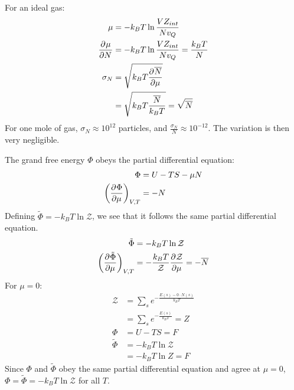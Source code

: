 \documentclass{article}
\begin{document}
For an ideal gas:
\begin{equation}
    \begin{split}
        \mu & = -k_BT\ln\frac{VZ_{int}}{Nv_Q} \\
        \frac{\partial^{} \mu} {\partial  N^{}} & = -k_BT\ln\frac{VZ_{int}}{Nv_Q} = \frac{k_BT}{N} \\
        \sigma_N & = \sqrt{k_BT\frac{\partial^{} \overline{N}} {\partial  \mu^{}}} \\
        & = \sqrt{k_BT\frac{\overline{N}}{k_BT}} = \sqrt{\overline{N}}
    \end{split}
\end{equation}
For one mole of gas, $\sigma_N \approx 10^{12}$ particles, and $\frac{\sigma_N}{N} \approx 10^{-12}$. The variation is then very negligible.

\clearpage

The grand free energy $\Phi$ obeys the partial differential equation: 
\begin{equation}
    \begin{split}
        \Phi & = U - TS - \mu N \\
        {\left(\frac{\partial^{} \Phi} {\partial \mu^{}}\right)}_{V,T} & = -N \\
    \end{split}
\end{equation}
Defining $\tilde{\Phi} = -k_BT\ln\mathcal{Z}$, we see that it follows the same partial differential equation.
\begin{equation}
    \begin{split}
        \tilde{\Phi} & = -k_BT\ln\mathcal{Z} \\
        {\left(\frac{\partial^{} \tilde{\Phi}} {\partial \mu^{}}\right)}_{V,T} & = -\frac{k_BT}{\mathcal{Z}}\frac{\partial^{} \mathcal{Z}} {\partial  \mu^{}} = -\overline{N}
    \end{split}
\end{equation}
For $\mu = 0$:
\begin{equation}
    \begin{split}
        \mathcal{Z} & = \sum_s e^{-\frac{E\left(s\right) - 0 \cdot N\left(s\right)}{k_BT}} \\
        & = \sum_s e^{-\frac{E\left(s\right)}{k_BT}} = Z \\
        \Phi & = U - TS = F \\
        \tilde{\Phi} & = -k_BT\ln\mathcal{Z} \\
        & = -k_BT\ln Z = F
    \end{split}
\end{equation}
Since $\Phi$ and $\tilde{\Phi}$ obey the same partial differential equation and agree at $\mu = 0$, $\Phi = \tilde{\Phi} = -k_BT\ln\mathcal{Z}$ for all $T$.
\end{document}
